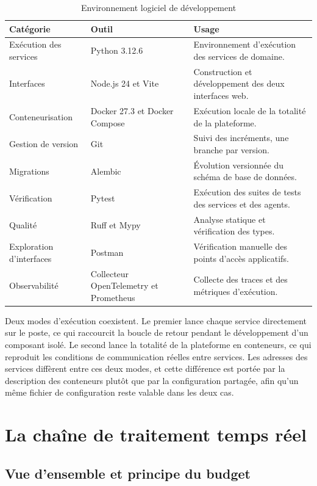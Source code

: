 \begin{table}[H]
\centering
\renewcommand{\arraystretch}{1.2}
\begin{tabular}{|p{4.2cm}|p{4.0cm}|p{6.3cm}|}
\hline
\textbf{Catégorie} & \textbf{Outil} & \textbf{Usage} \\
\hline
Exécution des services & Python 3.12.6 & Environnement d'exécution des services de domaine. \\
\hline
Interfaces & Node.js 24 et Vite & Construction et développement des deux interfaces web. \\
\hline
Conteneurisation & Docker 27.3 et Docker Compose & Exécution locale de la totalité de la plateforme. \\
\hline
Gestion de version & Git & Suivi des incréments, une branche par version. \\
\hline
Migrations & Alembic & Évolution versionnée du schéma de base de données. \\
\hline
Vérification & Pytest & Exécution des suites de tests des services et des agents. \\
\hline
Qualité & Ruff et Mypy & Analyse statique et vérification des types. \\
\hline
Exploration d'interfaces & Postman & Vérification manuelle des points d'accès applicatifs. \\
\hline
Observabilité & Collecteur OpenTelemetry et Prometheus & Collecte des traces et des métriques d'exécution. \\
\hline
\end{tabular}
\caption{Environnement logiciel de développement}
\label{tab:logiciel}
\end{table}

Deux modes d'exécution coexistent. Le premier lance chaque service directement sur le poste, ce qui raccourcit la boucle de retour pendant le développement d'un composant isolé. Le second lance la totalité de la plateforme en conteneurs, ce qui reproduit les conditions de communication réelles entre services. Les adresses des services diffèrent entre ces deux modes, et cette différence est portée par la description des conteneurs plutôt que par la configuration partagée, afin qu'un même fichier de configuration reste valable dans les deux cas.

\section{La chaîne de traitement temps réel}

\subsection{Vue d'ensemble et principe du budget}

